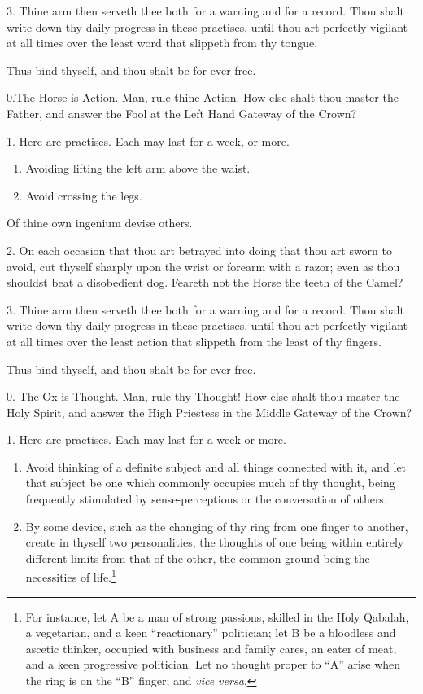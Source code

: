 3. Thine arm then serveth thee both for a warning and for a record. Thou shalt write down thy daily progress in these practises, until thou art perfectly vigilant at all times over the least word that slippeth from thy tongue.

Thus bind thyself, and thou shalt be for ever free.

0.The Horse is Action. Man, rule thine Action. How else shalt thou master the Father, and answer the Fool at the Left Hand Gateway of the Crown?

1. Here are practises. Each may last for a week, or more.

\begin{enumerate}[label=\greek*.]
\item Avoiding lifting the left arm above the waist.

\item Avoid crossing the legs.
\end{enumerate}

Of thine own ingenium devise others.

2. On each occasion that thou art betrayed into doing that thou art sworn to avoid, cut thyself sharply upon the wrist or forearm with a razor; even as thou shouldst beat a disobedient dog. Feareth not the Horse the teeth of the Camel?

3. Thine arm then serveth thee both for a warning and for a record. Thou shalt write down thy daily progress in these practises, until thou art perfectly vigilant at all times over the least action that slippeth from the least of thy fingers.

Thus bind thyself, and thou shalt be for ever free.

0. The Ox is Thought. Man, rule thy Thought! How else shalt thou master the Holy Spirit, and answer the High Priestess in the Middle Gateway of the Crown?

1. Here are practises. Each may last for a week or more.

\begin{enumerate}[label=\greek*.]
\item Avoid thinking of a definite subject and all things connected with it, and let that subject be one which commonly occupies much of thy thought, being frequently stimulated by sense-perceptions or the conversation of others.

\item By some device, such as the changing of thy ring from one finger to another, create in thyself two personalities, the thoughts of one being within entirely different limits from that of the other, the common ground being the necessities of life.\footnote{For instance, let A be a man of strong passions, skilled in the Holy Qabalah, a vegetarian, and a keen \enquote{reactionary} politician; let B be a bloodless and ascetic thinker, occupied with business and family cares, an eater of meat, and a keen progressive politician. Let no thought proper to \enquote{A} arise when the ring is on the \enquote{B} finger; and \textit{vice versa}.}
\end{enumerate}

